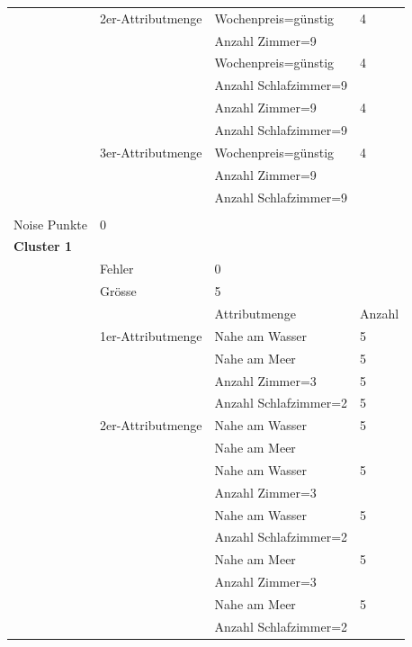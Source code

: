 \begin{longtable}{ | l | l | l | l |}
	& 2er-Attributmenge & \tabitem Wochenpreis=günstig & 4 \\
	& & \tabitem Anzahl Zimmer=9 & \\ \cline{3-4}
	& & \tabitem Wochenpreis=günstig & 4 \\
	& & \tabitem Anzahl Schlafzimmer=9 & \\ \cline{3-4} 
	& & \tabitem Anzahl Zimmer=9 & 4 \\
	& & \tabitem Anzahl Schlafzimmer=9 & \\ \cline{2-4}
	
	& 3er-Attributmenge & \tabitem Wochenpreis=günstig & 4 \\
	& & \tabitem Anzahl Zimmer=9 & \\ 
	& & \tabitem Anzahl Schlafzimmer=9 & \\ \hline
	
	\rowcolor{tableheadcolor}
	\multicolumn{4}{|l|}{\bfseries Tatsächliches Resultat} \\ \hline 
	Noise Punkte & \multicolumn{3}{|l|}{0} \\ \hline 
	
	\multicolumn{4}{|l|}{\textbf{Cluster 1}} \\ \cline{2-4} 
	& Fehler & \multicolumn{2}{|l|}{0} \\ \cline{2-4} 
	& Grösse & \multicolumn{2}{|l|}{5} \\ \cline{2-4} 
	&& Attributmenge & Anzahl \\ \cline{2-4} 
	
	& 1er-Attributmenge & \tabitem Nahe am Wasser & 5 \\ \cline{3-4} 
	& & \tabitem Nahe am Meer & 5 \\ \cline{3-4} 
	& & \tabitem Anzahl Zimmer=3 & 5 \\ \cline{3-4} 
	& & \tabitem Anzahl Schlafzimmer=2 & 5 \\ \cline{2-4} 
	
	& 2er-Attributmenge & \tabitem Nahe am Wasser & 5 \\
	& & \tabitem Nahe am Meer & \\ \cline{3-4} 
	& & \tabitem Nahe am Wasser & 5 \\
	& & \tabitem Anzahl Zimmer=3 & \\ \cline{3-4} 
	& & \tabitem Nahe am Wasser & 5 \\
	& & \tabitem Anzahl Schlafzimmer=2 & \\ \cline{3-4} 
	
	& & \tabitem Nahe am Meer & 5 \\
	& & \tabitem Anzahl Zimmer=3 & \\ \cline{3-4} 
	& & \tabitem Nahe am Meer & 5 \\
	& & \tabitem Anzahl Schlafzimmer=2 & \\ \cline{3-4} 
	

\end{longtable}
